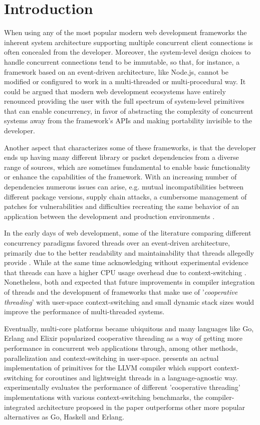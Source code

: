 \section{Introduction}
When using any of the most popular modern web development frameworks the inherent system architecture supporting multiple concurrent client connections is often concealed from the developer. Moreover, the system-level design choices to handle concurrent connections tend to be immutable, so that, for instance, a framework based on an event-driven architecture, like Node.js, cannot be modified or configured to work in a multi-threaded or multi-procedural way. It could be argued that modern web development ecosystems have entirely renounced providing the user with the full spectrum of system-level primitives that can enable concurrency, in favor of abstracting the complexity of concurrent systems away from the framework's APIs and making portability invisible to the developer.

Another aspect that characterizes some of these frameworks, is that the developer ends up having many different library or packet dependencies from a diverse range of sources, which are sometimes fundamental to enable basic functionality or enhance the capabilities of the framework. With an increasing number of dependencies numerous issues can arise, e.g. mutual incompatibilities between different package versions, supply chain attacks, a cumbersome management of patches for vulnerabilities and difficulties recreating the same behavior of an application between the development and production environments \cite{2012PoulHenning}. 

In the early days of web development, some of the literature comparing different concurrency paradigms favored threads over an event-driven architecture, primarily due to the better readability and maintainability that threads allegedly provide \cite{2003Events}\cite{2005Threads}. While at the same time acknowledging without experimental evidence that threads can have a higher CPU usage overhead due to context-switching \cite{2003Events}. Nonetheless, both \cite{2003Events} and \cite{2005Threads} expected that future improvements in compiler integration of threads and the development of frameworks that make use of '\textit{cooperative threading}' with user-space context-switching and small dynamic stack sizes would improve the performance of multi-threaded systems.

Eventually, multi-core platforms became ubiquitous and many languages like Go, Erlang and Elixir popularized cooperative threading as a way of getting more performance in concurrent web applications through, among other methods, parallelization and context-switching in user-space. \cite{2013ContextSwitching} presents an actual implementation of primitives for the LLVM compiler which support context-switching for coroutines and lightweight threads in a language-agnostic way. \cite{2013ContextSwitching} experimentally evaluates the performance of different 'cooperative threading' implementations with various context-switching benchmarks, the compiler-integrated architecture proposed in the paper outperforms other more popular alternatives as Go, Haskell and Erlang. 

